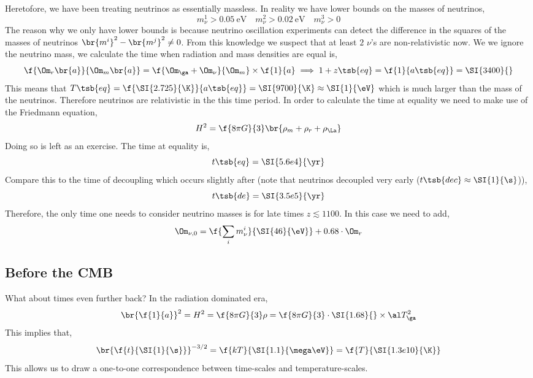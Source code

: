 \documentclass{article}
\begin{document}
Heretofore, we have been treating neutrinos as essentially massless. In reality we have lower bounds on the masses of neutrinos,
\[ m_\nu^1 > \SI{0.05}{\eV} \quad m_\nu^2 > \SI{0.02}{\eV} \quad m_\nu^3 > 0 \]
The reason why we only have lower bounds is because neutrino oscillation experiments can detect the difference in the squares of the masses of neutrinos $\br{m^i}^2 - \br{m^j}^2 \neq 0$. From this knowledge we suspect that at least $2$ $\nu$'s are non-relativistic now. We we ignore the neutrino mass, we calculate the time when radiation and mass densities are equal is,
\[ \f{\Om_r\br{a}}{\Om_m\br{a}} = \f{\Om_\ga + \Om_\nu}{\Om_m} \times \f{1}{a} \implies 1 + z\tsb{eq} = \f{1}{a\tsb{eq}} = \SI{3400}{} \]
This means that $T\tsb{eq} = \f{\SI{2.725}{\K}}{a\tsb{eq}} = \SI{9700}{\K} \approx \SI{1}{\eV}$ which is much larger than the mass of the neutrinos. Therefore neutrinos are relativistic in the this time period.
In order to calculate the time at equality we need to make use of the Friedmann equation,
\[ H^2 = \f{8\pi G}{3}\br{\rho_m + \rho_r + \rho_\La} \]
Doing so is left as an exercise. The time at equality is,
\[ t\tsb{eq} = \SI{5.6e4}{\yr} \]
Compare this to the time of decoupling which occurs slightly after (note that neutrinos decoupled very early ($t\tsb{dec} \approx \SI{1}{\s}$)),
\[ t\tsb{de} = \SI{3.5e5}{\yr} \]
Therefore, the only time one needs to consider neutrino masses is for late times $z \lesssim 1100$.  In this case we need to add,
\[ \Om_{\nu, 0} = \f{\sum_i m_\nu^i}{\SI{46}{\eV}} + 0.68 \cdot \Om_{r} \]

\subsection{Before the CMB}
What about times even further back? In the radiation dominated era,
\[ \br{\f{1}{a}}^2 = H^2 = \f{8 \pi G}{3} \rho = \f{8 \pi G}{3} \cdot \SI{1.68}{} \times \al T_\ga^2 \]
This implies that,
\[ \br{\f{t}{\SI{1}{\s}}}^{-3/2} = \f{k T}{\SI{1.1}{\mega \eV}} = \f{T}{\SI{1.3e10}{\K}}  \]
This allows us to draw a one-to-one correspondence between time-scales and temperature-scales.
\end{document}
